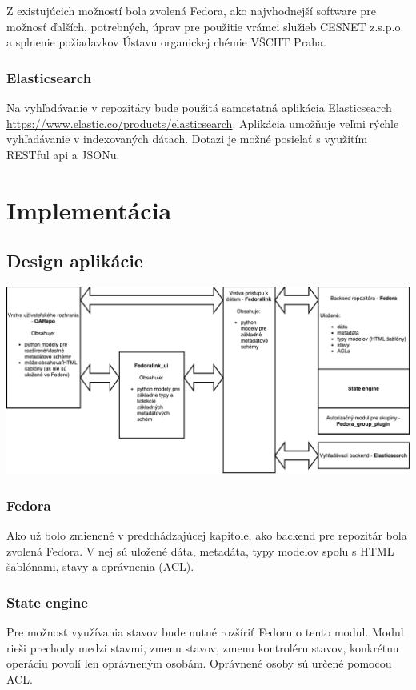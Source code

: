 \documentclass[thesis=M,slovak]{FITthesis}[2013/05/06]
\begin{document}
Z existujúcich možností bola zvolená Fedora, ako najvhodnejší software pre možnosť ďalších, potrebných, úprav pre použitie vrámci služieb CESNET z.s.p.o. a splnenie požiadavkov Ústavu organickej chémie VŠCHT Praha.

\subsection{Elasticsearch}
Na vyhľadávanie v repozitáry bude použitá samostatná aplikácia Elasticsearch \url{https://www.elastic.co/products/elasticsearch}. Aplikácia umožňuje veľmi rýchle vyhľadávanie v indexovaných dátach. Dotazi je možné posielať s využitím RESTful api a JSONu.




\chapter{Implementácia}
\section{Design aplikácie}
\includegraphics[width=1.0\textwidth]{diagramy/Architektura_repozitara.pdf}

\subsection{Fedora}
Ako už bolo zmienené v predchádzajúcej kapitole, ako backend pre repozitár bola zvolená Fedora. V nej sú uložené dáta, metadáta, typy modelov spolu s HTML šablónami, stavy a oprávnenia (ACL).

\subsection{State engine}
Pre možnosť využívania stavov bude nutné rozšíriť Fedoru o tento modul. Modul rieši prechody medzi stavmi, zmenu stavov, zmenu kontroléru stavov, konkrétnu operáciu povolí len oprávneným osobám. Oprávnené osoby sú určené pomocou ACL.
\end{document}
